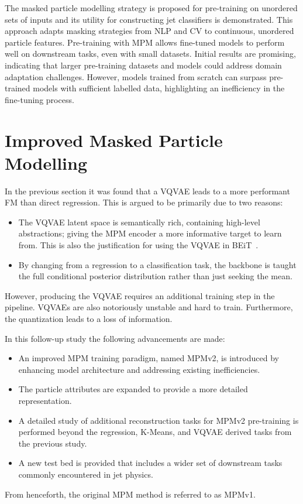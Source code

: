 The masked particle modelling strategy is proposed for pre-training on unordered sets of inputs and its utility for constructing jet classifiers is demonstrated.
This approach adapts masking strategies from NLP and CV to continuous, unordered particle features.
Pre-training with MPM allows fine-tuned models to perform well on downstream tasks, even with small datasets.
Initial results are promising, indicating that larger pre-training datasets and models could address domain adaptation challenges.
However, models trained from scratch can surpass pre-trained models with sufficient labelled data, highlighting an inefficiency in the fine-tuning process.

\section{Improved Masked Particle Modelling}

In the previous section it was found that a VQVAE leads to a more performant FM than direct regression.
This is argued to be primarily due to two reasons:
\begin{itemize}
    \item The VQVAE latent space is semantically rich, containing high-level abstractions; giving the MPM encoder a more informative target to learn from.
          This is also the justification for using the VQVAE in BEiT~\cite{BEIT}.
    \item By changing from a regression to a classification task, the backbone is taught the full conditional posterior distribution rather than just seeking the mean.
\end{itemize}

However, producing the VQVAE requires an additional training step in the pipeline.
VQVAEs are also notoriously unstable and hard to train.
Furthermore, the quantization leads to a loss of information.

In this follow-up study the following advancements are made:
\begin{itemize}
    \item An improved MPM training paradigm, named MPMv2, is introduced by enhancing model architecture and addressing existing inefficiencies.
    \item The particle attributes are expanded to provide a more detailed representation.
    \item A detailed study of additional reconstruction tasks for MPMv2 pre-training is performed beyond the regression, K-Means, and VQVAE derived tasks from the previous study.
    \item A new test bed is provided that includes a wider set of downstream tasks commonly encountered in jet physics.
\end{itemize}
From henceforth, the original MPM method is referred to as MPMv1.

